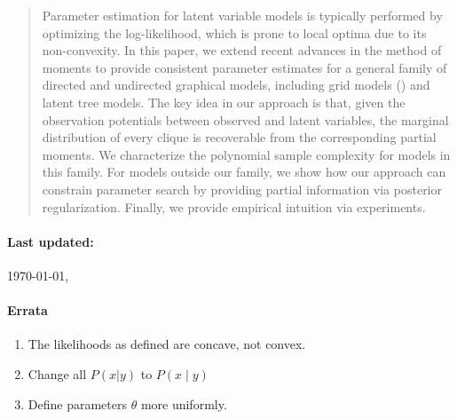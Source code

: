 \begin{abstract} 

Parameter estimation for latent variable models is typically
  performed by optimizing the log-likelihood, which is prone to local
  optima due to its non-convexity. 
In this paper, we extend recent advances in the method of moments 
  to provide consistent parameter estimates for a general family of
  directed and undirected graphical models, including grid models
  () and latent tree models.
The key idea in our approach is that, given the observation potentials
  between observed and latent variables, the marginal distribution of
  every clique is recoverable from the corresponding partial moments.
We characterize the polynomial sample complexity for models in this
  family.
For models outside our family, we show how our approach can constrain
  parameter search by providing partial information via posterior
  regularization. 
Finally, we provide empirical intuition via experiments.

\end{abstract} 

\paragraph{Last updated:} \today, \currenttime


\paragraph{Errata}
\begin{enumerate}
  \item The likelihoods as defined are concave, not convex.
  \item Change all $P(x|y)$ to $P(x \mid y)$
  \item Define parameters $\theta$ more uniformly.
\end{enumerate}


